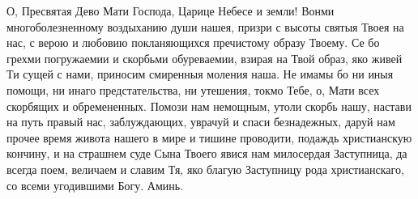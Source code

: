 О, Пресвятая Дево Мати Господа, Царице Небесе и земли! Вонми многоболезненному воздыханию души нашея, призри с высоты святыя Твоея на нас, с верою и любовию покланяющихся пречистому образу Твоему. Се бо грехми погружаемии и скорбьми обуреваемии, взирая на Твой образ, яко живей Ти сущей с нами, приносим смиренныя моления наша. Не имамы бо ни иныя помощи, ни инаго предстательства, ни утешения, токмо Тебе, о, Мати всех скорбящих и обремененных. Помози нам немощным, утоли скорбь нашу, настави на путь правый нас, заблуждающих, уврачуй и спаси безнадежных, даруй нам прочее время живота нашего в мире и тишине проводити, подаждь христианскую кончину, и на страшнем суде Сына Твоего явися нам милосердая Заступница, да всегда поем, величаем и славим Тя, яко благую Заступницу рода христианскаго, со всеми угодившими Богу. Аминь.
